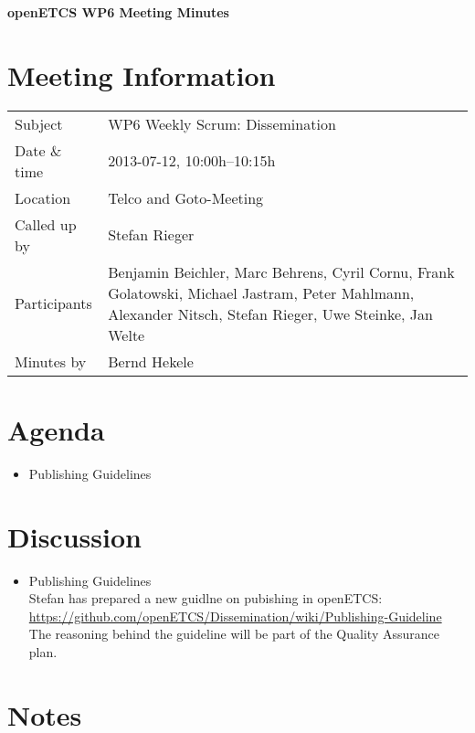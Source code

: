 \documentclass[a4paper, 11pt]{article}
\begin{document}
{\begin{center}\huge\bf openETCS WP6 Meeting Minutes\end{center}}
\section{Meeting Information}

\renewcommand{\arraystretch}{1.5}
\begin{supertabular}{m{.2\textwidth}m{.8\textwidth}}
Subject & WP6 Weekly Scrum: Dissemination\\
Date \& time & 2013-07-12, 10:00h--10:15h\\
Location & Telco and Goto-Meeting\\
Called up by & Stefan Rieger\\
Participants &
Benjamin Beichler,
Marc Behrens,
Cyril Cornu,
Frank Golatowski,
Michael Jastram,
Peter Mahlmann,
Alexander Nitsch,
Stefan Rieger,
Uwe Steinke,
Jan Welte
\\

Minutes by & Bernd Hekele\\

\end{supertabular}
\renewcommand{\arraystretch}{1.0}


\section{Agenda}
\begin{itemize}
\item Publishing Guidelines
\end{itemize}

\section{Discussion}

\begin{itemize}

\item Publishing Guidelines\\
Stefan has prepared a new guidlne on pubishing in openETCS:
\url{https://github.com/openETCS/Dissemination/wiki/Publishing-Guideline}\\
The reasoning behind the guideline will be part of the Quality Assurance plan.

\end{itemize}

\section{Notes}
\end{document}

